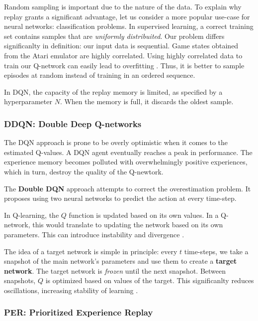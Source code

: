 Random sampling is important due to the nature of the data.
To explain why replay grants a significant advantage, let us consider a more popular use-case for neural networks: classification problems.
In supervised learning, a correct training set contains samples that are \emph{uniformly distribuited}.
Our problem differs significanlty in definition: our input data is sequential.
Game states obtained from the Atari emulator are highly correlated.
Using highly correlated data to train our Q-network can easily lead to overfitting \cite{jaromiru-dqn}.
Thus, it is better to sample episodes at random instead of training in an ordered sequence.

In DQN, the capacity of the replay memory is limited, as specified by a hyperparameter \(N\). When the memory is full, it discards the oldest sample.

\subsubsection{DDQN: Double Deep Q-networks}
The DQN approach is prone to be overly optimistic when it comes to the estimated Q-values.
A DQN agent eventually reaches a peak in performance.
The experience memory becomes polluted with overwhelmingly positive experiences, which in turn, destroy the quality of the Q-newtork.

The \textbf{Double DQN} \cite{ddqn-paper} approach attempts to correct the overestimation problem.
It proposes using two neural networks to predict the action at every time-step.

In Q-learning, the \(Q\) function is updated based on its own values.
In a Q-network, this would translate to updating the network based on its own parameters. This can introduce instability and divergence \cite{jaromiru-dqn}.

The idea of a target network is simple in principle:
every \(t\) time-steps, we take a snapshot of the main network's parameters and use them to create a \textbf{target network}.
The target network is \emph{frozen} \cite{long-peak-rl} until the next snapshot.
Between snapshots, \(Q\) is optimized based on values of the target.
This significanlty reduces oscillations, increasing stability of learning \cite{atari-dqn}.

\subsubsection{PER: Prioritized Experience Replay}

